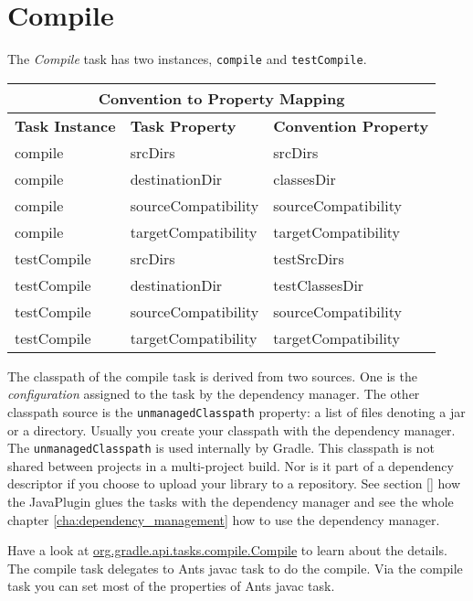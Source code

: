 \section{Compile} %
\label{sec:compile}
The \emph{Compile} task has two instances, \texttt{compile} and \texttt{testCompile}. 
\begin{center}
	\begin{tabular}{|l|l|l|} \hline
		\multicolumn{3}{|c|}{Convention to Property Mapping} \\ \hline
		\textbf{Task Instance} & \textbf{Task Property} & \textbf{Convention Property} \\ \hline
		compile & srcDirs & srcDirs \\ \hline
		compile & destinationDir & classesDir \\ \hline
		compile & sourceCompatibility & sourceCompatibility \\ \hline
		compile & targetCompatibility & targetCompatibility \\ \hline
		testCompile & srcDirs & testSrcDirs \\ \hline
		testCompile & destinationDir & testClassesDir \\ \hline
		testCompile & sourceCompatibility & sourceCompatibility \\ \hline
		testCompile & targetCompatibility & targetCompatibility \\ \hline
	\end{tabular} 
\end{center}
\noindent The classpath of the compile task is derived from two sources. One is the \emph{configuration} assigned to the task by the dependency manager. The other classpath source is the \texttt{unmanagedClasspath} property: a list of files denoting a jar or a directory. Usually you create your classpath with the dependency manager. The \texttt{unmanagedClasspath} is used internally by Gradle. This classpath is not shared between projects in a multi-project build. Nor is it part of a dependency descriptor if you choose to upload your library to a repository. 
See section \ref{} how the JavaPlugin glues the tasks with the dependency manager and see the whole chapter \ref{cha:dependency_management} how to use the dependency manager.

Have a look at \href{}{org.gradle.api.tasks.compile.Compile} to learn about the details. The compile task delegates to Ants javac task to do the compile. Via the compile task you can set most of the properties of Ants javac task. 

